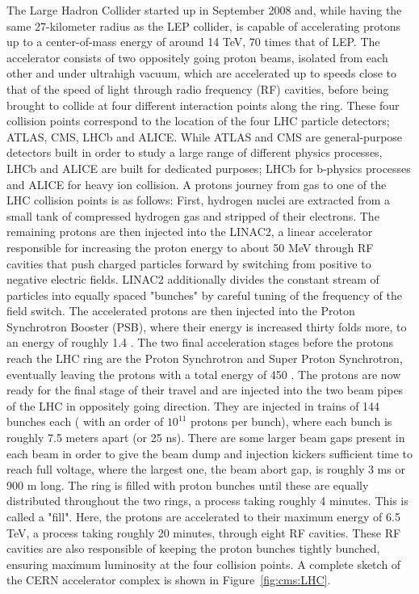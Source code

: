 The Large Hadron Collider started up in September 2008 and, while having the same 27-kilometer radius as the LEP collider, is capable of accelerating protons up to a center-of-mass energy of around 14 TeV, 70 times that of LEP. The accelerator consists of two oppositely going proton beams, isolated from each other and under ultrahigh vacuum, which are accelerated up to speeds close to that of the speed of light through radio frequency (RF) cavities, before being brought to collide at four different interaction points along the ring.
These four collision points correspond to the location of the four LHC particle detectors; ATLAS, CMS, LHCb and ALICE.
While ATLAS and CMS are general-purpose detectors built in order to study a large range of different physics processes, 
LHCb and ALICE are built for dedicated purposes; LHCb for b-physics processes and ALICE for heavy ion collision.
A protons journey from gas to one of the LHC collision points is as follows: First, hydrogen nuclei are extracted from a small tank of compressed hydrogen gas and stripped of their electrons. The remaining protons are then
injected into the LINAC2, a linear accelerator responsible for increasing the proton energy to about 50 MeV through RF cavities that push charged particles forward by switching from positive to negative electric fields. LINAC2 additionally divides the constant stream of particles into equally spaced "bunches" by careful tuning of the frequency of the field switch.
The accelerated protons are then injected into the Proton Synchrotron Booster (PSB), where their energy is increased thirty folds more, to an energy of roughly 1.4 \GeV. The two final acceleration stages before the protons reach the LHC ring are the Proton Synchrotron and Super Proton Synchrotron, eventually leaving the protons with a total energy of 450 \GeV. The protons are now ready for the final stage of their travel and are injected into the two beam pipes of the LHC in oppositely going direction. They are injected in trains of 144 bunches each ( with an order of $10^{11}$ protons per bunch), where each bunch is roughly 7.5 meters apart (or 25 ns). There are some larger beam gaps present in each beam in order to give the beam dump and injection kickers sufficient time to reach full voltage, where the largest one, the beam abort gap,  is roughly 3 ms or 900 m long. The ring is filled with proton bunches until these are equally distributed throughout the two rings, a process taking roughly 4 minutes. This is called a "fill". Here, the protons are accelerated to their maximum energy of 6.5 TeV, a process taking roughly 20 minutes, through eight RF cavities. These RF cavities are also responsible of keeping the proton bunches tightly bunched, ensuring maximum luminosity at the four collision points. A complete sketch of the CERN accelerator complex is shown in Figure~\ref{fig:cms:LHC}.

